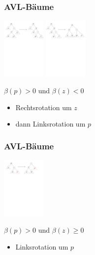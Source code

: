 \documentclass[aspectratio=1610, 11pt]{beamer}
\newcommand{\mytitle}{AVL-B\"aume}
\begin{document}
\begin{frame}\frametitle{\mytitle}
	\begin{overprint}
		\hfill\includegraphics[height=30mm]{./images/avl_insert_rightleft1.pdf}
		\onslide<2>\hfill\includegraphics[height=30mm]{./images/avl_insert_rightleft2.pdf}
	\end{overprint}
	\begin{exampleblock}{$\beta(p)>0$ und $\beta(z)<0$}
		\begin{itemize}
			\item Rechtsrotation um $z$
			\item dann Linksrotation um $p$
		\end{itemize}
	\end{exampleblock}
\end{frame}

\begin{frame}\frametitle{\mytitle}
	\hfill\includegraphics[height=30mm]{./images/avl_insert_left.pdf}
	\begin{exampleblock}{$\beta(p)>0$ und $\beta(z)\geq0$}
		\begin{itemize}
			\item Linksrotation um $p$
		\end{itemize}
	\end{exampleblock}
\end{frame}
\end{document}
